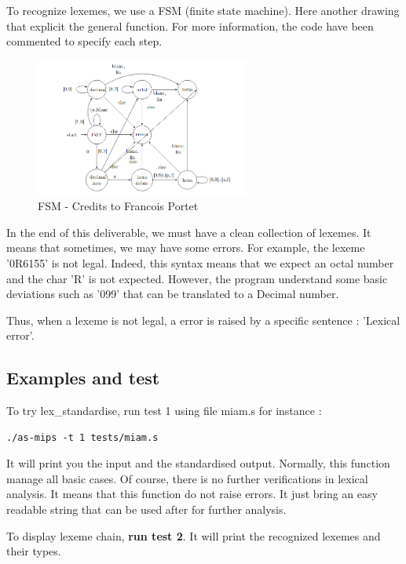 \documentclass[twoside,twocolumn]{article}
\begin{document}
To recognize lexemes, we use a FSM (finite state machine). Here another drawing that explicit the general function. For more information, the code have been commented to specify each step.

\begin{figure}[h!]
\begin{center}
\includegraphics[width=7cm]{images/FSM.png} 
\end{center}
\caption{FSM - Credits to Francois Portet}
\label{Lex chain}
\end{figure}

In the end of this deliverable, we must have a clean collection of lexemes. It means that sometimes, we may have some errors. For example, the lexeme '0R6155' is not legal. Indeed, this syntax means that we expect an octal number and the char 'R' is not expected. However, the program understand some basic deviations such as '099' that can be translated to a Decimal number.

Thus, when a lexeme is not legal, a error is raised by a specific sentence : 'Lexical error'.


\subsection{Examples and test}

To try lex\_standardise, run test 1 using file miam.s for instance :

\begin{lstlisting}
./as-mips -t 1 tests/miam.s
\end{lstlisting}

It will print you the input and the standardised output. Normally, this function manage all basic cases. Of course, there is no further verifications in lexical analysis. It means that this function do not raise errors. It just bring an easy readable string that can be used after for further analysis.

To display lexeme chain, \textbf{run test 2}. It will print the recognized lexemes and their types.
\end{document}
